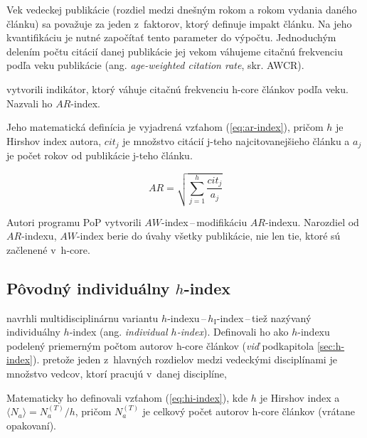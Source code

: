 Vek vedeckej publikácie (rozdiel medzi dnešným rokom a rokom vydania daného
článku) sa považuje za jeden z~faktorov, ktorý definuje impakt článku.  Na jeho
kvantifikáciu je nutné započítať tento parameter do výpočtu.  Jednoduchým
delením počtu citácií danej publikácie jej vekom váhujeme citačnú frekvenciu
podľa veku publikácie (ang. \emph{age-weighted citation rate}, skr. AWCR).

\citet{Jin2007} vytvorili indikátor, ktorý váhuje citačnú frekvenciu h-core
článkov podľa veku.  Nazvali ho $\mathit{AR}$-index.

Jeho matematická definícia je vyjadrená vzťahom (\ref{eq:ar-index}), pričom $h$ je
Hirshov index autora, $\mathit{cit}_j$ je množstvo citácií j-teho
najcitovanejšieho článku a $a_j$ je počet rokov od publikácie j-teho článku.

\begin{equation}
\label{eq:ar-index}
\mathit{AR} = \sqrt{\sum_{j=1}^h{\frac{\mathit{cit}_j}{a_j}}}
\end{equation}

Autori programu PoP
 vytvorili
$\mathit{AW}$-index\,--\,modifikáciu $\mathit{AR}$-indexu.  Narozdiel od
$\mathit{AR}$-indexu, $\mathit{AW}$-index berie do úvahy všetky publikácie, nie
len tie, ktoré sú začlenené v~h-core.


\subsection{Pôvodný individuálny $h$-index}
\label{sec:hi-index}

\citet{Batista2006} navrhli multidisciplinárnu variantu
$h$-indexu\,--\,$h_{\mathrm{I}}$-index\,--\,tiež nazývaný individuálny $h$-index (ang.
\emph{individual $h$-index}).  Definovali ho ako $h$-indexu podelený priemerným
počtom autorov h-core článkov (\emph{viď} podkapitola \ref{sec:h-index}).
pretože jeden z~hlavných rozdielov medzi vedeckými disciplínami je
množstvo vedcov, ktorí pracujú v~danej disciplíne,


Matematicky ho definovali vzťahom (\ref{eq:hi-index}), kde $h$ je Hirshov index a
$\langle N_a \rangle = N_a^{(T)} / h$, pričom $N_a^{(T)}$ je celkový počet
autorov h-core článkov (vrátane opakovaní).

